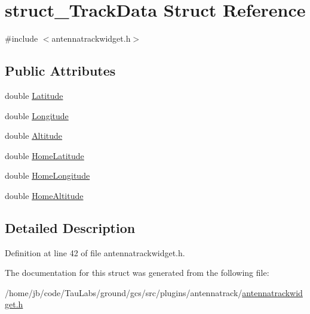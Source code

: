 \hypertarget{structstruct___track_data}{\section{struct\-\_\-\-Track\-Data \-Struct \-Reference}
\label{structstruct___track_data}
}


{\ttfamily \#include $<$antennatrackwidget.\-h$>$}

\subsection*{\-Public \-Attributes}
\begin{DoxyCompactItemize}
\item 
double \hyperlink{group___antenna_track_gadget_plugin_ga412a0215352cff81241572b0637ca6d5}{\-Latitude}
\item 
double \hyperlink{group___antenna_track_gadget_plugin_gadd67067451f9adf6f25e45bcb7498a32}{\-Longitude}
\item 
double \hyperlink{group___antenna_track_gadget_plugin_ga528ec049631eed362529f9ea5fd30b99}{\-Altitude}
\item 
double \hyperlink{group___antenna_track_gadget_plugin_gad25500d6984ee3227abe9b2663c0a975}{\-Home\-Latitude}
\item 
double \hyperlink{group___antenna_track_gadget_plugin_ga297bb9a225f2fa6033327e0d99bc5eac}{\-Home\-Longitude}
\item 
double \hyperlink{group___antenna_track_gadget_plugin_ga0bb6374ee3a9a6f864fbd03a1c791256}{\-Home\-Altitude}
\end{DoxyCompactItemize}


\subsection{\-Detailed \-Description}


\-Definition at line 42 of file antennatrackwidget.\-h.



\-The documentation for this struct was generated from the following file\-:\begin{DoxyCompactItemize}
\item 
/home/jb/code/\-Tau\-Labs/ground/gcs/src/plugins/antennatrack/\hyperlink{antennatrackwidget_8h}{antennatrackwidget.\-h}\end{DoxyCompactItemize}
